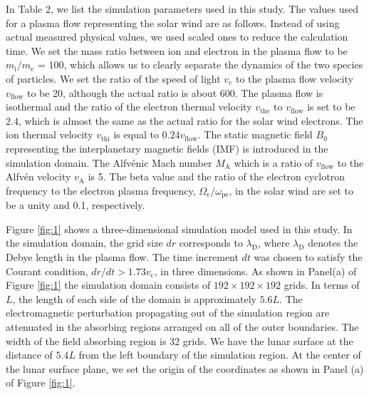 \documentclass[draft,jgrga]{agutex2015}
\begin{document}
\begin{article}
In Table 2, 
we list the simulation parameters used in this study. 
The values used for a plasma flow representing the solar wind are as follows. 
Instead of using actual measured physical values, 
we used scaled ones to reduce the calculation time. 
We set the mass ratio between ion and electron in the plasma flow 
to be $ m_\mathrm{i}/ m_\mathrm{e}$ = 100, which allows us 
to clearly separate the dynamics of the two species of particles. 
We set the ratio of the speed of light $v_\mathrm{c}$ to 
the plasma flow velocity $v_\mathrm{flow}$ to be 20, 
although the actual ratio is about 600. 
The plasma flow is isothermal and 
the ratio of the electron thermal velocity 
$v_\mathrm{the}$ to $v_\mathrm{flow}$ is set to be 2.4, 
which is almost the same as the actual ratio for the solar wind electrons. 
The ion thermal velocity $v_\mathrm{thi}$ is equal to $0.24v_\mathrm{flow}$.
The static magnetic field $B_0$ representing the interplanetary magnetic fields (IMF) 
is introduced in the simulation domain. 
The Alfv\'{e}nic Mach number $M_\mathrm{A}$ which is a ratio of $v_\mathrm{flow}$ to 
the Alfv\'{e}n velocity $v_\mathrm{A}$ is 5. 
The beta value and the ratio of 
the electron cyclotron frequency to
the electron plasma frequency,
$\Omega_\mathrm{e} / \omega_\mathrm{pe}$, 
in the solar wind are set to be a unity and 0.1, respectively. 

Figure \ref{fig:1} shows a three-dimensional simulation model used in this study.
In the simulation domain, 
the grid size $dr$ corresponds to $\lambda_\mathrm{D}$, 
where $\lambda_\mathrm{D}$ denotes the Debye length in the plasma flow.
The time increment $dt$ was chosen to satisfy 
the Courant condition, $dr/dt > 1.73 v_\mathrm{c}$, in three dimensions. 
As shown in Panel(a) of Figure \ref{fig:1} 
the simulation domain consists of $192 \times 192 \times 192$ grids. 
In terms of $L$, the length of each side of the domain is approximately $5.6L$. 
The electromagnetic perturbation propagating out of the simulation region
are attenuated in the absorbing regions arranged on all of the outer boundaries. 
The width of the field absorbing region is 32 grids.
We have the lunar surface at the distance of $5.4L$ 
from the left boundary of the simulation region.
At the center of the lunar surface plane, 
we set the origin of the coordinates 
as shown in Panel (a) of Figure \ref{fig:1}.


\end{article}
\end{document}
